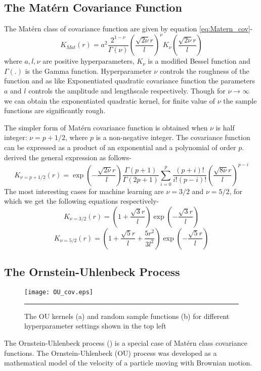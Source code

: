 \subsection{The Mat{\'e}rn Covariance Function}
The Mat{\'e}rn class of covariance function are given by equation \ref{eq:Matern_cov}-
\begin{equation} \label{eq:Matern_cov}
K_{Mat}(r)= a^2\frac{2^{1-\nu}}{\Gamma(\nu)}\left(\frac{\sqrt{2\nu}r}{l}\right)^\nu K_{\nu}
	  \left(\frac{\sqrt{2\nu}r}{l}\right)
\end{equation}
where $a, l, \nu$ are positive hyperparameters, $K_{\nu}$ is a modified Bessel function and $\Gamma \left(.\right)$ is the Gamma function. Hyperparameter $\nu$ controls the roughness of the function and as like Exponentiated quadratic covariance function the parameters $a$ and $l$ controls the amplitude and lengthscale respectively. Though for $\nu \to \infty$ we can obtain the exponentiated quadratic kernel, for finite value of $\nu$ the sample functions are significantly rough. 

The simpler form of Mat{\'e}rn covariance function is obtained when $\nu$ is half integer: $\nu = p+1/2$, where $p$ is a non-negative integer. The covariance function can be expressed as a product of an exponential and a polynomial of order $p$. \cite{Abramowitz:1965} derived the general expression as follows-
\begin{equation} \label{eq:MaternGeneral}
K_{\nu=p+1/2}(r)= \exp \left( - \frac{\sqrt{2\nu}r}{l}\right)\frac{\Gamma\left(p+1\right)}{\Gamma\left(2p+1\right)}
		\sum_{i=0}^{p}\frac{\left(p+i\right)!}{i!\left(p-i\right)!}
		\left(\frac{\sqrt{8\nu}r}{l}\right)^{p-i}
\end{equation}
The most interesting cases for machine learning are $\nu =3/2$ and $\nu=5/2$, for which we get the following equations respectively-
\begin{equation} \label{eq:Matern32}
K_{\nu=3/2}(r)= \left(1+ \frac{\sqrt{3}r}{l} \right)\exp \left( - \frac{\sqrt{3}r}{l} \right)
\end{equation}
\begin{equation} \label{eq:Matern52}
K_{\nu=5/2}(r)= \left(1+ \frac{\sqrt{5}r}{l} + \frac{5r^2}{3l^2} \right)
		\exp \left( - \frac{\sqrt{5}r}{l} \right)
\end{equation}

\subsection{The Ornstein-Uhlenbeck Process}
\begin{figure}[t]
	\centering
		\texttt{[image: OU\_cov.eps]}
		\rule{35em}{0.5pt}
	\caption[The OU kernels and random sample functions]
		{The OU kernels (a) and random sample functions (b) for different hyperparameter settings shown in the top left}
	\label{fig:OU_covariance}
\end{figure}
The Ornstein-Uhlenbeck process (\cite{Ornstein_Uhlenbeck:1930}) is a special case of Mat{\'e}rn class covariance functions. The Ornstein-Uhlenbeck (OU) process was developed as a mathematical model of the velocity of a particle moving with Brownian motion.

